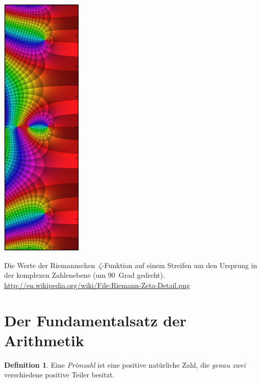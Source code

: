 \documentclass[twoside]{../zirkelblatt1415}
\theoremstyle{definition}
\newtheorem{defn}{Definition}[section]
\theoremstyle{plain}
\theoremstyle{remark}
\begin{document}

\begin{center}
\includegraphics[angle=90]{zeta-function-complex}

\vspace{0.4cm}
\begin{minipage}{0.9\textwidth}
\scriptsize Die Werte der Riemannschen~$\zeta$-Funktion auf einem Streifen um den
Ursprung in der komplexen Zahlenebene (um 90~Grad gedreht).
\url{http://en.wikipedia.org/wiki/File:Riemann-Zeta-Detail.png}\par
\end{minipage}
\end{center}

\vspace{1em}
{\renewcommand{\addvspace}[1]{\vskip0.6em}
\tableofcontents%
}

\newpage

\section{Der Fundamentalsatz der Arithmetik}

\begin{defn}Eine \emph{Primzahl} ist eine positive natürliche Zahl, die
\emph{genau zwei} verschiedene positive Teiler besitzt.\end{defn}
\end{document}
